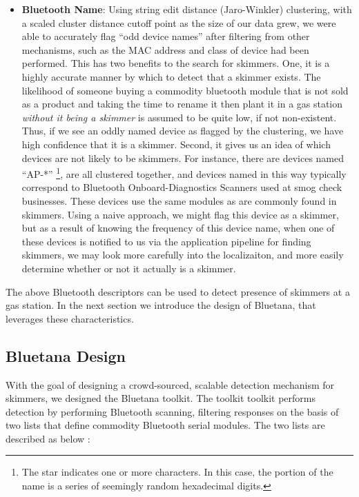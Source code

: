 \begin{itemize}
	\item \textbf{Bluetooth Name}: Using string edit distance (Jaro-Winkler)
clustering, with a scaled cluster distance cutoff point as the size of our data
grew, we were able to accurately flag ``odd device names'' after filtering from
other mechanisms, such as the MAC address and class of device had been
performed. This has two benefits to the search for skimmers. One, it is a highly
accurate manner by which to detect that a skimmer exists. The likelihood of
someone buying a commodity bluetooth module that is not sold as a product and
taking the time to rename it then plant it in a gas station \textit{without it
being a skimmer} is assumed to be quite low, if not non-existent. Thus, if we
see an oddly named device as flagged by the clustering, we have high confidence
that it is a skimmer. Second, it gives us an idea of which devices are not
likely to be skimmers. For instance, there are devices named ``AP-*''
\footnote{The star indicates one or more characters. In this case, the portion
of the name is a series of seemingly random hexadecimal digits.}, are all
clustered together, and devices named in this way typically correspond to
Bluetooth Onboard-Diagnostics Scanners used at smog check businesses. These
devices use the same modules as are commonly found in skimmers. Using a naive
approach, we might flag this device as a skimmer, but as a result of knowing the
frequency of this device name, when one of these devices is notified to us via
the application pipeline for finding skimmers, we may look more carefully into
the localizaiton, and more easily determine whether or not it actually is a
skimmer.
\end {itemize}

The above Bluetooth descriptors can be used to detect presence of skimmers at a
gas station. In the next section we introduce the design of Bluetana, that
leverages these characteristics.

\subsection {Bluetana Design} With the goal of designing a crowd-sourced,
scalable detection mechanism for skimmers, we designed the Bluetana toolkit. The
toolkit toolkit performs detection by performing Bluetooth scanning, filtering
responses on the basis of two lists that define commodity Bluetooth serial
modules. The two lists are described as below :

